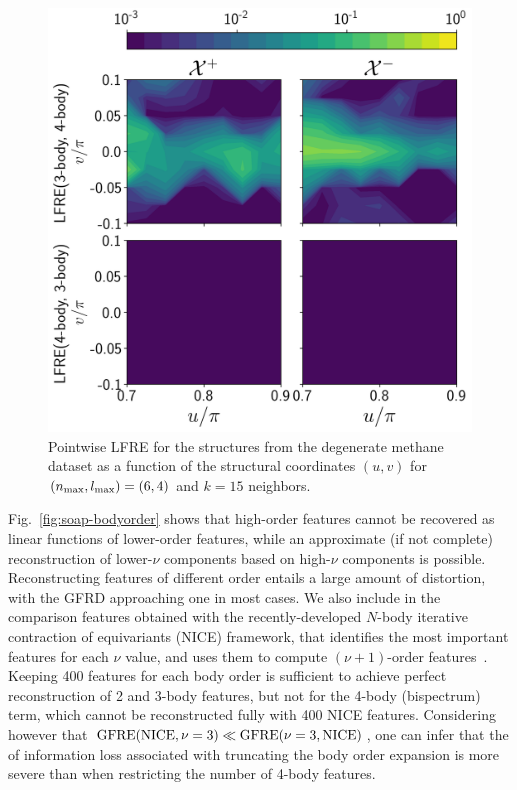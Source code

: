 \begin{figure}
    \centering
    \includegraphics[scale=0.42]{fig/rof/lfre-body_order_comparison-nb_local_neighbours=15-degenerated_manifold.png}
\caption{Pointwise LFRE for the structures from the degenerate methane dataset as a function of the structural coordinates $(u,v)$ for $(n_\mathrm{max},l_\mathrm{max}) = (6,4)$ and $k=15$ neighbors.}
    \label{fig:soap_degenerated_manifold_lfre}
\end{figure}

Fig.~\ref{fig:soap-bodyorder} shows that high-order features cannot be recovered as linear functions of lower-order features, while an approximate (if not complete) reconstruction of lower-$\nu$ components based on high-$\nu$ components is possible. Reconstructing features of different order entails a large amount of distortion, with the GFRD approaching one in most cases. 
We also include in the comparison features obtained with the recently-developed $N$-body iterative contraction of equivariants (NICE) framework, that identifies the most important features for each $\nu$ value, and uses them to compute  $(\nu+1)$-order features~\cite{niga+20jcp}. Keeping 400 features for each body order is sufficient to achieve perfect reconstruction of 2 and 3-body features, but not for the 4-body (bispectrum) term, which cannot be reconstructed fully with 400 NICE features. Considering however that $\operatorname{GFRE}(\text{NICE},\nu=3)\ll \operatorname{GFRE}(\nu=3, \text{NICE})$, one can infer that the of information loss associated with truncating the body order expansion is more severe than when restricting the number of 4-body features. 

